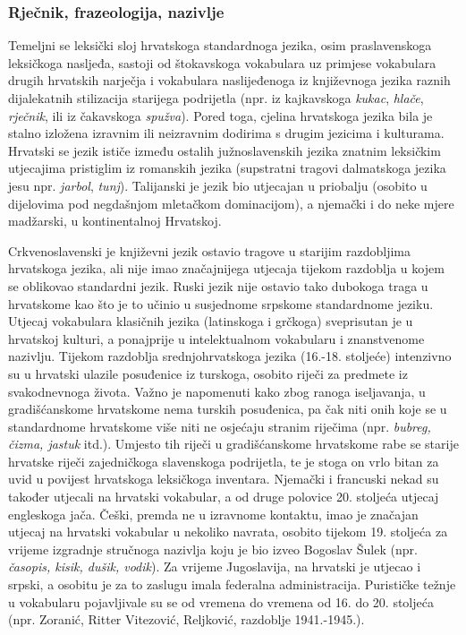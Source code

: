 \begin{multicols}{2}
\subsubsection{Rječnik, frazeologija, nazivlje}

Temeljni se leksički sloj hrvatskoga standardnoga jezika, osim praslavenskoga leksičkoga nasljeđa, sastoji od štokavskoga vokabulara uz primjese vokabulara drugih hrvatskih narječja i vokabulara naslijeđenoga iz književnoga jezika raznih dijalekatnih stilizacija starijega podrijetla (npr. iz kajkavskoga \emph{kukac}, \emph{hlače}, \emph{rječnik}, ili iz čakavskoga \emph{spužva}). Pored toga, cjelina hrvatskoga jezika bila je stalno izložena izravnim ili neizravnim dodirima s drugim jezicima i kulturama. Hrvatski se jezik ističe između ostalih južnoslavenskih jezika znatnim leksičkim utjecajima pristiglim iz romanskih jezika (supstratni tragovi dalmatskoga jezika jesu npr. \emph{jarbol}, \emph{tunj}). Talijanski je jezik bio utjecajan u priobalju (osobito u dijelovima pod negdašnjom mletačkom dominacijom), a njemački i do neke mjere madžarski, u kontinentalnoj Hrvatskoj.

Crkvenoslavenski je književni jezik ostavio tragove u starijim razdobljima hrvatskoga jezika, ali nije imao značajnijega utjecaja tijekom razdoblja u kojem se oblikovao standardni jezik. Ruski jezik nije ostavio tako dubokoga traga u hrvatskome kao što je to učinio u susjednome srpskome standardnome jeziku. Utjecaj vokabulara klasičnih jezika (latinskoga i grčkoga) sveprisutan je u hrvatskoj kulturi, a ponajprije u intelektualnom vokabularu i znanstvenome nazivlju. Tijekom razdoblja srednjohrvatskoga jezika (16.-18. stoljeće) intenzivno su u hrvatski ulazile posuđenice iz turskoga, osobito riječi za predmete iz svakodnevnoga života. Važno je napomenuti kako zbog ranoga iseljavanja, u gradišćanskome hrvatskome nema turskih posuđenica, pa čak niti onih koje se u standardnome hrvatskome više niti ne osjećaju stranim riječima (npr. \emph{bubreg, čizma, jastuk} itd.). Umjesto tih riječi u gradišćanskome hrvatskome rabe se starije hrvatske riječi zajedničkoga slavenskoga podrijetla, te je stoga on vrlo bitan za uvid u povijest hrvatskoga leksičkoga inventara. Njemački i francuski nekad su također utjecali na hrvatski vokabular, a od druge polovice 20. stoljeća utjecaj engleskoga jača. Češki, premda ne u izravnome kontaktu, imao je značajan utjecaj na hrvatski vokabular u nekoliko navrata, osobito tijekom 19. stoljeća za vrijeme izgradnje stručnoga nazivlja koju je bio izveo Bogoslav Šulek (npr. \emph{časopis, kisik, dušik, vodik}). Za vrijeme Jugoslavija, na hrvatski je utjecao i srpski, a osobitu je za to zaslugu imala federalna administracija. Purističke težnje u vokabularu pojavljivale su se od vremena do vremena od 16. do 20. stoljeća (npr. Zoranić, Ritter Vitezović, Reljković, razdoblje 1941.-1945.).


\end{multicols}
